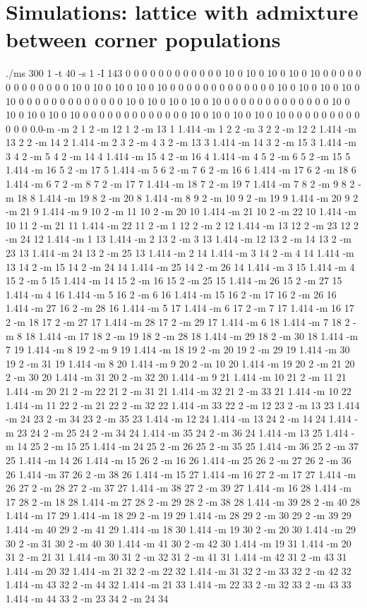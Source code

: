 \documentclass[12pt]{article}
\begin{document}
\section*{Simulations: lattice with admixture between corner populations}
./ms 300 1 -t 40 -s 1 -I 143 0 0 0 0 0 0 0 0 0 0 0 0 10 0 10 0 10 0 10 0 10 0 0 0 0 0 0 0 0 0 0 0 0 0 10 0 10 0 10 0 10 0 10 0 0 0 0 0 0 0 0 0 0 0 0 0 10 0 10 0 10 0 10 0 10 0 0 0 0 0 0 0 0 0 0 0 0 0 10 0 10 0 10 0 10 0 10 0 0 0 0 0 0 0 0 0 0 0 0 0 10 0 10 0 10 0 10 0 10 0 0 0 0 0 0 0 0 0 0 0 0 0 10 0 10 0 10 0 10 0 10 0 0 0 0 0 0 0 0 0 0 0 0 0.0-m -m 2 1 2 -m 12 1 2 -m 13 1 1.414 -m 1 2 2 -m 3 2 2 -m 12 2 1.414 -m 13 2 2 -m 14 2 1.414 -m 2 3 2 -m 4 3 2 -m 13 3 1.414 -m 14 3 2 -m 15 3 1.414 -m 3 4 2 -m 5 4 2 -m 14 4 1.414 -m 15 4 2 -m 16 4 1.414 -m 4 5 2 -m 6 5 2 -m 15 5 1.414 -m 16 5 2 -m 17 5 1.414 -m 5 6 2 -m 7 6 2 -m 16 6 1.414 -m 17 6 2 -m 18 6 1.414 -m 6 7 2 -m 8 7 2 -m 17 7 1.414 -m 18 7 2 -m 19 7 1.414 -m 7 8 2 -m 9 8 2 -m 18 8 1.414 -m 19 8 2 -m 20 8 1.414 -m 8 9 2 -m 10 9 2 -m 19 9 1.414 -m 20 9 2 -m 21 9 1.414 -m 9 10 2 -m 11 10 2 -m 20 10 1.414 -m 21 10 2 -m 22 10 1.414 -m 10 11 2 -m 21 11 1.414 -m 22 11 2 -m 1 12 2 -m 2 12 1.414 -m 13 12 2 -m 23 12 2 -m 24 12 1.414 -m 1 13 1.414 -m 2 13 2 -m 3 13 1.414 -m 12 13 2 -m 14 13 2 -m 23 13 1.414 -m 24 13 2 -m 25 13 1.414 -m 2 14 1.414 -m 3 14 2 -m 4 14 1.414 -m 13 14 2 -m 15 14 2 -m 24 14 1.414 -m 25 14 2 -m 26 14 1.414 -m 3 15 1.414 -m 4 15 2 -m 5 15 1.414 -m 14 15 2 -m 16 15 2 -m 25 15 1.414 -m 26 15 2 -m 27 15 1.414 -m 4 16 1.414 -m 5 16 2 -m 6 16 1.414 -m 15 16 2 -m 17 16 2 -m 26 16 1.414 -m 27 16 2 -m 28 16 1.414 -m 5 17 1.414 -m 6 17 2 -m 7 17 1.414 -m 16 17 2 -m 18 17 2 -m 27 17 1.414 -m 28 17 2 -m 29 17 1.414 -m 6 18 1.414 -m 7 18 2 -m 8 18 1.414 -m 17 18 2 -m 19 18 2 -m 28 18 1.414 -m 29 18 2 -m 30 18 1.414 -m 7 19 1.414 -m 8 19 2 -m 9 19 1.414 -m 18 19 2 -m 20 19 2 -m 29 19 1.414 -m 30 19 2 -m 31 19 1.414 -m 8 20 1.414 -m 9 20 2 -m 10 20 1.414 -m 19 20 2 -m 21 20 2 -m 30 20 1.414 -m 31 20 2 -m 32 20 1.414 -m 9 21 1.414 -m 10 21 2 -m 11 21 1.414 -m 20 21 2 -m 22 21 2 -m 31 21 1.414 -m 32 21 2 -m 33 21 1.414 -m 10 22 1.414 -m 11 22 2 -m 21 22 2 -m 32 22 1.414 -m 33 22 2 -m 12 23 2 -m 13 23 1.414 -m 24 23 2 -m 34 23 2 -m 35 23 1.414 -m 12 24 1.414 -m 13 24 2 -m 14 24 1.414 -m 23 24 2 -m 25 24 2 -m 34 24 1.414 -m 35 24 2 -m 36 24 1.414 -m 13 25 1.414 -m 14 25 2 -m 15 25 1.414 -m 24 25 2 -m 26 25 2 -m 35 25 1.414 -m 36 25 2 -m 37 25 1.414 -m 14 26 1.414 -m 15 26 2 -m 16 26 1.414 -m 25 26 2 -m 27 26 2 -m 36 26 1.414 -m 37 26 2 -m 38 26 1.414 -m 15 27 1.414 -m 16 27 2 -m 17 27 1.414 -m 26 27 2 -m 28 27 2 -m 37 27 1.414 -m 38 27 2 -m 39 27 1.414 -m 16 28 1.414 -m 17 28 2 -m 18 28 1.414 -m 27 28 2 -m 29 28 2 -m 38 28 1.414 -m 39 28 2 -m 40 28 1.414 -m 17 29 1.414 -m 18 29 2 -m 19 29 1.414 -m 28 29 2 -m 30 29 2 -m 39 29 1.414 -m 40 29 2 -m 41 29 1.414 -m 18 30 1.414 -m 19 30 2 -m 20 30 1.414 -m 29 30 2 -m 31 30 2 -m 40 30 1.414 -m 41 30 2 -m 42 30 1.414 -m 19 31 1.414 -m 20 31 2 -m 21 31 1.414 -m 30 31 2 -m 32 31 2 -m 41 31 1.414 -m 42 31 2 -m 43 31 1.414 -m 20 32 1.414 -m 21 32 2 -m 22 32 1.414 -m 31 32 2 -m 33 32 2 -m 42 32 1.414 -m 43 32 2 -m 44 32 1.414 -m 21 33 1.414 -m 22 33 2 -m 32 33 2 -m 43 33 1.414 -m 44 33 2 -m 23 34 2 -m 24 34 
\end{document}
